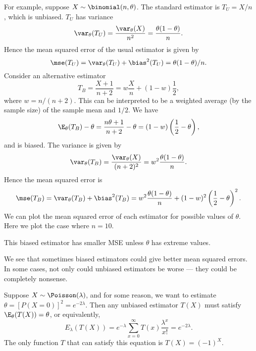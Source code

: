 \documentclass[a4paper]{article}
\begin{document}
For example, suppose $X\sim \binomial(n, \theta)$. The standard estimator is $T_U = X/n$, which is unbiased. $T_U$ has variance
\[
  \var_\theta(T_U) = \frac{\var_\theta(X)}{n^2} = \frac{\theta(1 - \theta)}{n}.
\]
Hence the mean squared error of the usual estimator is given by
\[
  \mse (T_U) = \var_\theta(T_U) + \bias^2(T_U) = \theta(1 - \theta)/n.
\]
Consider an alternative estimator
\[
  T_B = \frac{X + 1}{n + 2} = w\frac{X}{n} + (1 - w)\frac{1}{2},
\]
where $w = n/(n + 2)$. This can be interpreted to be a weighted average (by the sample size) of the sample mean and $1/2$. We have
\[
  \E_\theta(T_B) - \theta = \frac{n\theta + 1}{n + 2} - \theta = (1 - w)\left(\frac{1}{2} - \theta\right),
\]
and is biased. The variance is given by
\[
  \var_\theta(T_B) = \frac{\var_\theta(X)}{(n + 2)^2} = w^2\frac{\theta(1 - \theta)}{n}.
\]
Hence the mean squared error is
\[
  \mse (T_B) = \var_\theta(T_B) + \bias^2(T_B) = w^2\frac{\theta(1 - \theta)}{n} + (1 - w)^2\left(\frac{1}{2} - \theta\right)^2.
\]
We can plot the mean squared error of each estimator for possible values of $\theta$. Here we plot the case where $n = 10$.
\begin{center}
\end{center}
This biased estimator has smaller MSE unless $\theta$ has extreme values.

We see that sometimes biased estimators could give better mean squared errors. In some cases, not only could unbiased estimators be worse --- they could be completely nonsense.

Suppose $X\sim \Poisson(\lambda)$, and for some reason, we want to estimate $\theta = [P(X = 0)]^2 = e^{-2\lambda}$. Then any unbiased estimator $T(X)$ must satisfy $\E_\theta(T(X)) = \theta$, or equivalently,
\[
  E_\lambda(T(X)) = e^{-\lambda}\sum_{x = 0}^\infty T(x) \frac{\lambda^x}{x!} = e^{-2\lambda}.
\]
The only function $T$ that can satisfy this equation is $T(X) = (-1)^X$.
\end{document}
